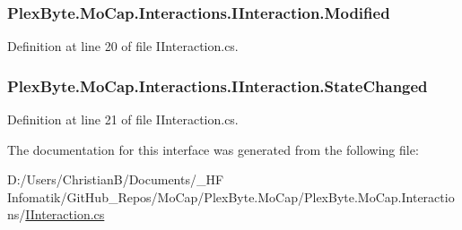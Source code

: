 \subsubsection[{\texorpdfstring{Modified}{Modified}}]{ Plex\+Byte.\+Mo\+Cap.\+Interactions.\+I\+Interaction.\+Modified}\hypertarget{interface_plex_byte_1_1_mo_cap_1_1_interactions_1_1_i_interaction_a54b3a6e068719473b4a34d10504766a1}{}\label{interface_plex_byte_1_1_mo_cap_1_1_interactions_1_1_i_interaction_a54b3a6e068719473b4a34d10504766a1}


Definition at line 20 of file I\+Interaction.\+cs.

\subsubsection[{\texorpdfstring{State\+Changed}{StateChanged}}]{ Plex\+Byte.\+Mo\+Cap.\+Interactions.\+I\+Interaction.\+State\+Changed}\hypertarget{interface_plex_byte_1_1_mo_cap_1_1_interactions_1_1_i_interaction_af6cf60a1a30e422da1b7552868c03001}{}\label{interface_plex_byte_1_1_mo_cap_1_1_interactions_1_1_i_interaction_af6cf60a1a30e422da1b7552868c03001}


Definition at line 21 of file I\+Interaction.\+cs.



The documentation for this interface was generated from the following file\+:\begin{DoxyCompactItemize}
\item 
D\+:/\+Users/\+Christian\+B/\+Documents/\+\_\+\+H\+F Infomatik/\+Git\+Hub\+\_\+\+Repos/\+Mo\+Cap/\+Plex\+Byte.\+Mo\+Cap/\+Plex\+Byte.\+Mo\+Cap.\+Interactions/\hyperlink{_i_interaction_8cs}{I\+Interaction.\+cs}\end{DoxyCompactItemize}
